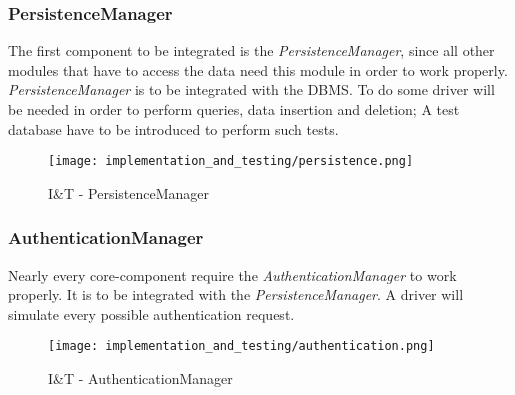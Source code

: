 \subsubsection{PersistenceManager}
The first component to be integrated is the \textit{PersistenceManager}, since all other modules that have to access the data need this module in order to work properly. \textit{PersistenceManager} is to be integrated with the DBMS. To do some driver will be needed in order to perform queries, data insertion and deletion; A test database have to be introduced to perform such tests.
\begin{figure}[H]
	\begin{center}
		\texttt{[image: implementation\_and\_testing/persistence.png]}
	\end{center}
	\caption{I\&T - PersistenceManager}
\end{figure}

\subsubsection{AuthenticationManager}
Nearly every core-component require the \textit{AuthenticationManager} to work properly. It is to be integrated with the \textit{PersistenceManager}. A driver will simulate every possible authentication request.
\begin{figure}[H]
	\begin{center}
		\texttt{[image: implementation\_and\_testing/authentication.png]}
	\end{center}
	\caption{I\&T - AuthenticationManager}
\end{figure}

